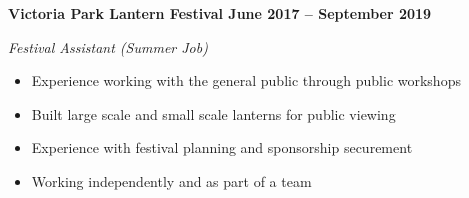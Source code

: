 \vspace{0.1cm}
\textbf{Victoria Park Lantern Festival \hfill June 2017 -- September 2019} \par
\textit{Festival Assistant (Summer Job)} \par
\begin{itemize}
	\item Experience working with the general public through public workshops
    \item Built large scale and small scale lanterns for public viewing
    \item Experience with festival planning and sponsorship securement
    \item Working independently and as part of a team
\end{itemize} \par